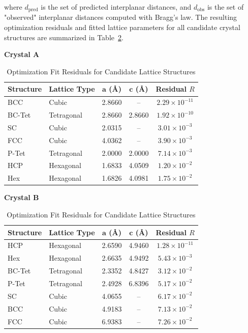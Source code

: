 \documentclass[12pt]{article}
\begin{document}
where $d_{\text{pred}}$ is the set of predicted interplanar distances, and $d_{\text{obs}}$ is the set of "observed" interplanar distances computed with Bragg's law.
The resulting optimization residuals and fitted lattice parameters for all candidate crystal structures are summarized in Table~\ref{tab:residuals}.

\begin{table}[ht]
    \centering
    \caption{Optimization Fit Residuals for Candidate Lattice Structures}
    \label{tab:residuals}
    \textbf{Crystal A}\\[0.5ex]
    \begin{tabular}{llccc}
        \toprule
        \textbf{Structure} & \textbf{Lattice Type} & $\mathbf{a}$ (\AA) & $\mathbf{c}$ (\AA) & \textbf{Residual $R$} \\
        \midrule
        BCC & Cubic & 2.8660 & -- & $2.29 \times 10^{-11}$ \\
        BC-Tet & Tetragonal & 2.8660 & 2.8660 & $1.92 \times 10^{-10}$ \\
        SC & Cubic & 2.0315 & -- & $3.01 \times 10^{-3}$ \\
        FCC & Cubic & 4.0362 & -- & $3.90 \times 10^{-3}$ \\
        P-Tet & Tetragonal & 2.0000 & 2.0000 & $7.14 \times 10^{-3}$ \\
        HCP & Hexagonal & 1.6833 & 4.0509 & $1.20 \times 10^{-2}$ \\
        Hex & Hexagonal & 1.6826 & 4.0981 & $1.75 \times 10^{-2}$ \\
        \bottomrule
    \end{tabular}

    \vspace{1.2em}

    \textbf{Crystal B}\\[0.5ex]
    \begin{tabular}{llccc}
        \toprule
        \textbf{Structure} & \textbf{Lattice Type} & $\mathbf{a}$ (\AA) & $\mathbf{c}$ (\AA) & \textbf{Residual $R$} \\
        \midrule
        HCP & Hexagonal & 2.6590 & 4.9460 & $1.28 \times 10^{-11}$ \\
        Hex & Hexagonal & 2.6635 & 4.9492 & $5.43 \times 10^{-3}$ \\
        BC-Tet & Tetragonal & 2.3352 & 4.8427 & $3.12 \times 10^{-2}$ \\
        P-Tet & Tetragonal & 2.4928 & 6.8396 & $5.17 \times 10^{-2}$ \\
        SC & Cubic & 4.0655 & -- & $6.17 \times 10^{-2}$ \\
        BCC & Cubic & 4.9183 & -- & $7.13 \times 10^{-2}$ \\
        FCC & Cubic & 6.9383 & -- & $7.26 \times 10^{-2}$ \\
        \bottomrule
    \end{tabular}
\end{table}
\end{document}
